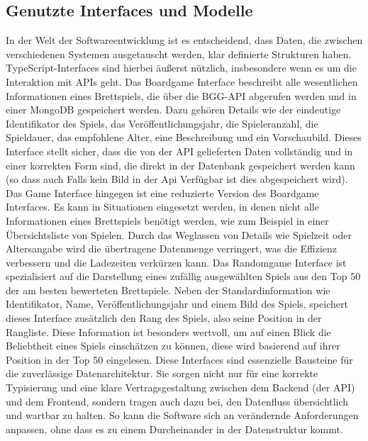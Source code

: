 \subsection{Genutzte Interfaces und Modelle}
In der Welt der Softwareentwicklung ist es entscheidend, dass Daten, die zwischen verschiedenen
Systemen ausgetauscht werden, klar definierte Strukturen haben. TypeScript-Interfaces sind hierbei
äußerst nützlich, insbesondere wenn es um die Interaktion mit APIs geht.
Das Boardgame Interface beschreibt alle wesentlichen Informationen eines Brettspiels, die über die
BGG-API abgerufen werden und in einer MongoDB gespeichert werden. Dazu gehören Details wie der
eindeutige Identifikator des Spiels, das Veröffentlichungsjahr, die Spieleranzahl, die Spieldauer, das
empfohlene Alter, eine Beschreibung und ein Vorschaubild. Dieses Interface stellt sicher, dass die von
der API gelieferten Daten vollständig und in einer korrekten Form sind, die direkt in der Datenbank
gespeichert werden kann (so dass auch Falls kein Bild in der Api Verfügbar ist dies abgespeichert
wird).
Das Game Interface hingegen ist eine reduzierte Version des Boardgame Interfaces. Es kann in
Situationen eingesetzt werden, in denen nicht alle Informationen eines Brettspiels benötigt werden,
wie zum Beispiel in einer Übersichtsliste von Spielen. Durch das Weglassen von Details wie Spielzeit
oder Altersangabe wird die übertragene Datenmenge verringert, was die Effizienz verbessern und die
Ladezeiten verkürzen kann.
Das Randomgame Interface ist spezialisiert auf die Darstellung eines zufällig ausgewählten Spiels aus
den Top 50 der am besten bewerteten Brettspiele. Neben der Standardinformation wie Identifikator,
Name, Veröffentlichungsjahr und einem Bild des Spiels, speichert dieses Interface zusätzlich den Rang
des Spiels, also seine Position in der Rangliste. Diese Information ist besonders wertvoll, um auf einen
Blick die Beliebtheit eines Spiels einschätzen zu können, diese wird basierend auf ihrer Position in der
Top 50 eingelesen.
Diese Interfaces sind essenzielle Bausteine für die zuverlässige Datenarchitektur. Sie sorgen nicht nur
für eine korrekte Typisierung und eine klare Vertragsgestaltung zwischen dem Backend (der API) und
dem Frontend, sondern tragen auch dazu bei, den Datenfluss übersichtlich und wartbar zu halten. So
kann die Software sich an verändernde Anforderungen anpassen, ohne dass es zu einem
Durcheinander in der Datenstruktur kommt.

